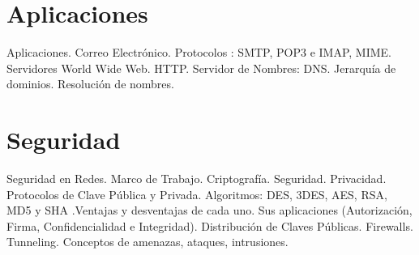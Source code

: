 \documentclass[10pt,a4paper]{article}
\begin{document}
{\section{Aplicaciones}
Aplicaciones. Correo Electrónico. Protocolos : SMTP, POP3 e IMAP, MIME. Servidores World Wide Web. HTTP. Servidor de Nombres: DNS. Jerarquía de dominios. Resolución de nombres.

\section{Seguridad}
Seguridad en Redes. Marco de Trabajo. Criptografía. Seguridad. Privacidad. Protocolos de Clave Pública y Privada. Algoritmos: DES, 3DES, AES, RSA, MD5 y SHA .Ventajas y desventajas de cada uno. Sus aplicaciones (Autorización, Firma, Confidencialidad e Integridad). Distribución de Claves Públicas. Firewalls. Tunneling. Conceptos de amenazas, ataques, intrusiones.
}
\end{document}

